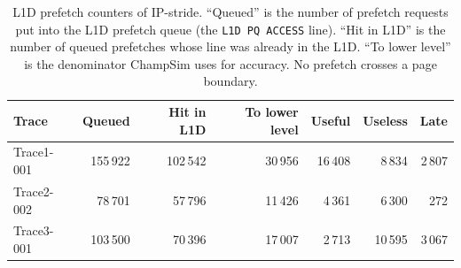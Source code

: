 \documentclass[11pt,a4paper]{article}
\begin{document}
\begin{table}[H]
    \centering
    \begin{tabular}{lrrrrrr}
        \toprule
        Trace & Queued & Hit in L1D & To lower level & Useful & Useless & Late \\
        \midrule
        Trace1-001 & 155\,922 & 102\,542 & 30\,956 & 16\,408 & 8\,834  & 2\,807 \\
        Trace2-002 & 78\,701  & 57\,796  & 11\,426 & 4\,361  & 6\,300  & 272    \\
        Trace3-001 & 103\,500 & 70\,396  & 17\,007 & 2\,713  & 10\,595 & 3\,067 \\
        \bottomrule
    \end{tabular}
    \caption{L1D prefetch counters of IP-stride. ``Queued'' is the number of prefetch requests put
    into the L1D prefetch queue (the \texttt{L1D PQ ACCESS} line). ``Hit in L1D'' is the number of
    queued prefetches whose line was already in the L1D. ``To lower level'' is the denominator
    ChampSim uses for accuracy. No prefetch crosses a page boundary.}
    \label{tab:task1a-pf}
\end{table}
\end{document}
